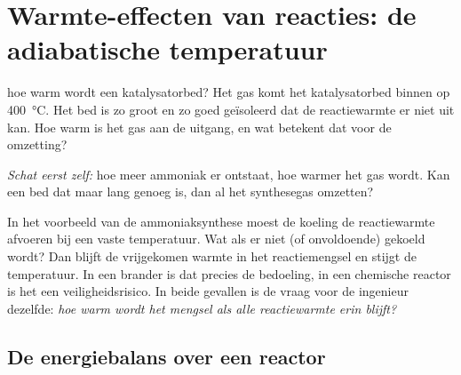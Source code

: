 \section{Warmte-effecten van reacties: de adiabatische temperatuur}
\label{sec:warmte-effecten}

\begin{casus}{hoe warm wordt een katalysatorbed?}
Het gas komt het katalysatorbed binnen op \SI{400}{\celsius}. Het bed is zo groot en zo goed ge\"isoleerd dat de reactiewarmte er niet uit kan. Hoe warm is het gas aan de uitgang, en wat betekent dat voor de omzetting?

\emph{Schat eerst zelf:} hoe meer ammoniak er ontstaat, hoe warmer het gas wordt. Kan een bed dat maar lang genoeg is, dan al het synthesegas omzetten?
\end{casus}

In het voorbeeld van de ammoniaksynthese moest de koeling de reactiewarmte afvoeren bij een vaste temperatuur. Wat als er niet (of onvoldoende) gekoeld wordt? Dan blijft de vrijgekomen warmte in het reactiemengsel en stijgt de temperatuur. In een brander is dat precies de bedoeling, in een chemische reactor is het een veiligheidsrisico. In beide gevallen is de vraag voor de ingenieur dezelfde: \emph{hoe warm wordt het mengsel als alle reactiewarmte erin blijft?}

\subsection{De energiebalans over een reactor}

